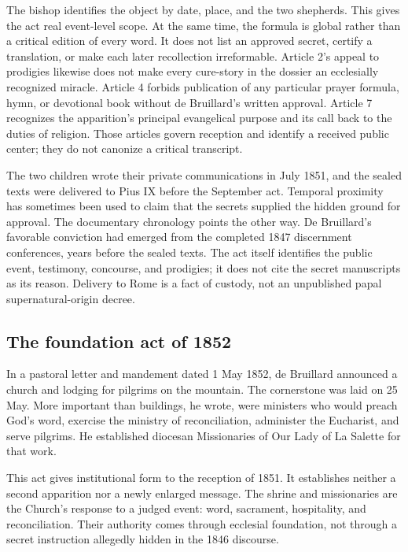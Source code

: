 The bishop identifies the object by date, place, and the two shepherds. This gives the act real event-level scope. At the same time, the formula is global rather than a critical edition of every word. It does not list an approved secret, certify a translation, or make each later recollection irreformable. Article 2's appeal to prodigies likewise does not make every cure-story in the dossier an ecclesially recognized miracle. Article 4 forbids publication of any particular prayer formula, hymn, or devotional book without de Bruillard's written approval. Article 7 recognizes the apparition's principal evangelical purpose and its call back to the duties of religion. Those articles govern reception and identify a received public center; they do not canonize a critical transcript.

The two children wrote their private communications in July 1851, and the sealed texts were delivered to Pius IX before the September act. Temporal proximity has sometimes been used to claim that the secrets supplied the hidden ground for approval. The documentary chronology points the other way. De Bruillard's favorable conviction had emerged from the completed 1847 discernment conferences, years before the sealed texts. The act itself identifies the public event, testimony, concourse, and prodigies; it does not cite the secret manuscripts as its reason. Delivery to Rome is a fact of custody, not an unpublished papal supernatural-origin decree.

\subsection{The foundation act of 1852}

In a pastoral letter and mandement dated 1 May 1852, de Bruillard announced a church and lodging for pilgrims on the mountain. The cornerstone was laid on 25 May. More important than buildings, he wrote, were ministers who would preach God's word, exercise the ministry of reconciliation, administer the Eucharist, and serve pilgrims. He established diocesan Missionaries of Our Lady of La Salette for that work.

This act gives institutional form to the reception of 1851. It establishes neither a second apparition nor a newly enlarged message. The shrine and missionaries are the Church's response to a judged event: word, sacrament, hospitality, and reconciliation. Their authority comes through ecclesial foundation, not through a secret instruction allegedly hidden in the 1846 discourse.

